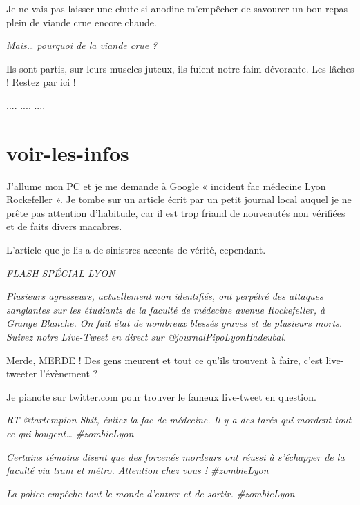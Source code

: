 Je ne vais pas laisser une chute si anodine m'empêcher de savourer un bon repas plein de viande crue encore chaude.

\textit{Mais… pourquoi de la viande crue ?}

Ils sont partis, sur leurs muscles juteux, ils fuient notre faim dévorante. Les lâches ! Restez par ici !

.... .... ....

\section{voir-les-infos}

J'allume mon PC et je me demande à Google « incident fac médecine Lyon Rockefeller ». Je tombe sur un article écrit par un petit journal local auquel je ne prête pas attention d'habitude, car il est trop friand de nouveautés non vérifiées et de faits divers macabres.

L'article que je lis a de sinistres accents de vérité, cependant.

\begin{center}
\textit{FLASH SPÉCIAL LYON}

\textit{Plusieurs agresseurs, actuellement non identifiés, ont perpétré des attaques sanglantes sur les étudiants de la faculté de médecine avenue Rockefeller, à Grange Blanche. On fait état de nombreux blessés graves et de plusieurs morts. Suivez notre Live-Tweet en direct sur @journalPipoLyonHadeubal}.
\end{center}

Merde, MERDE ! Des gens meurent et tout ce qu'ils trouvent à faire, c'est live-tweeter l'évènement ?

Je pianote sur twitter.com pour trouver le fameux live-tweet en question.

\begin{center}
\textit{RT @tartempion Shit, évitez la fac de médecine. Il y a des tarés qui mordent tout ce qui bougent… \#{}zombieLyon}
\end{center}

\begin{center}
\textit{Certains témoins disent que des forcenés mordeurs ont réussi à s'échapper de la faculté via tram et métro. Attention chez vous ! \#{}zombieLyon}
\end{center}

\begin{center}
\textit{La police empêche tout le monde d'entrer et de sortir. \#{}zombieLyon}
\end{center}

